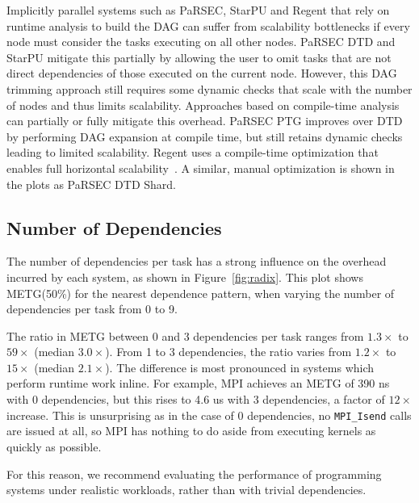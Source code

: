 Implicitly parallel systems such as PaRSEC, StarPU and Regent that
rely on runtime analysis to build the DAG can suffer from
scalability bottlenecks if every node must consider the tasks
executing on all other nodes. PaRSEC DTD and StarPU mitigate this
partially by allowing the user to omit tasks that are not direct
dependencies of those executed on the current node. However, this DAG
trimming approach still requires some dynamic checks that scale with
the number of nodes and thus limits scalability. Approaches based on compile-time analysis can
partially or fully mitigate this overhead. PaRSEC PTG improves over DTD by performing DAG expansion at compile time, but
still retains dynamic checks leading to limited scalability. Regent
uses a compile-time optimization that enables full horizontal
scalability~\cite{ControlReplication17}. A similar, manual
optimization is shown in the plots as PaRSEC DTD Shard.



\subsection{Number of Dependencies}
\label{subsec:number-of-dependencies}



The number of dependencies per task has a strong influence on the
overhead incurred by each system, as shown in
Figure~\ref{fig:radix}. This plot shows METG(50\%) for the nearest
dependence pattern, when varying the number of dependencies per task
from 0 to 9.


The ratio in METG between 0 and 3 dependencies per task ranges from
$1.3\times$ to $59\times$ (median $3.0\times$). From 1 to 3
dependencies, the ratio varies from $1.2\times$ to $15\times$ (median
$2.1\times$). The difference is most pronounced in systems which
perform runtime work inline. For example, MPI achieves an METG of 390
ns with 0 dependencies, but this rises to 4.6 us with 3 dependencies,
a factor of $12\times$ increase. This is unsurprising as in the case
of 0 dependencies, no \lstinline[language=C++]{MPI_Isend} calls are
issued at all, so MPI has nothing to do aside from executing kernels
as quickly as possible.

For this reason, we recommend evaluating the performance of
programming systems under realistic workloads, rather than with
trivial dependencies.

